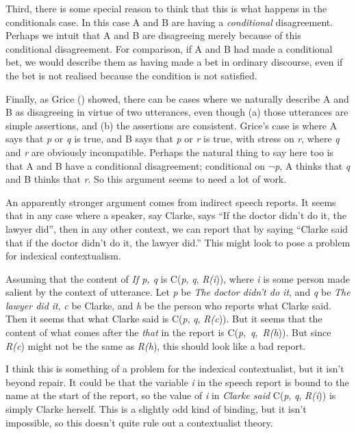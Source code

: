 \documentclass[
  11pt,
  letterpaper,
  DIV=11,
  numbers=noendperiod,
  oneside]{scrartcl}
\begin{document}
Third, there is some special reason to think that this is what happens
in the conditionals case. In this case A and B are having a
\emph{conditional} disagreement. Perhaps we intuit that A and B are
disagreeing merely because of this conditional disagreement. For
comparison, if A and B had made a conditional bet, we would describe
them as having made a bet in ordinary discourse, even if the bet is not
realised because the condition is not satisfied.

Finally, as Grice () showed, there can be
cases where we naturally describe A and B as disagreeing in virtue of
two utterances, even though (a) those utterances are simple assertions,
and (b) the assertions are consistent. Grice's case is where A says that
\emph{p} or \emph{q} is true, and B says that \emph{p} or \emph{r} is
true, with stress on \emph{r}, where \emph{q} and \emph{r} are obviously
incompatible. Perhaps the natural thing to say here too is that A and B
have a conditional disagreement; conditional on \(\neg\)\emph{p}, A
thinks that \emph{q} and B thinks that \emph{r}. So this argument seems
to need a lot of work.

An apparently stronger argument comes from indirect speech reports. It
seems that in any case where a speaker, say Clarke, says ``If the doctor
didn't do it, the lawyer did'', then in any other context, we can report
that by saying ``Clarke said that if the doctor didn't do it, the lawyer
did.'' This might look to pose a problem for indexical contextualism.

Assuming that the content of \emph{If p, q} is C(\emph{p}, \emph{q},
\emph{R(i})), where \emph{i} is some person made salient by the context
of utterance. Let \emph{p} be \emph{The doctor didn't do it}, and
\emph{q} be \emph{The lawyer did it}, \emph{c} be Clarke, and \emph{h}
be the person who reports what Clarke said. Then it seems that what
Clarke said is C(\emph{p}, \emph{q}, \emph{R(c})). But it seems that the
content of what comes after the \emph{that} in the report is
C(\emph{p},~\emph{q},~\emph{R(h})). But since \emph{R(c}) might not be
the same as \emph{R(h}), this should look like a bad report.

I think this is something of a problem for the indexical contextualist,
but it isn't beyond repair. It could be that the variable \emph{i} in
the speech report is bound to the name at the start of the report, so
the value of \emph{i} in \emph{Clarke said} C(\emph{p}, \emph{q},
\emph{R(i})) is simply Clarke herself. This is a slightly odd kind of
binding, but it isn't impossible, so this doesn't quite rule out a
contextualist theory.
\end{document}
